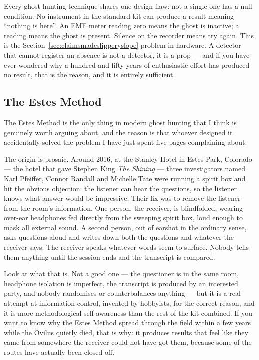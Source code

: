 \ufowrapclear
\begin{funfact}
Every ghost-hunting technique shares one design flaw: not a single one has a null condition. No
instrument in the standard kit can produce a result meaning ``nothing is here''. An EMF meter
reading zero means the ghost is inactive; a reading means the ghost is present. Silence on the
recorder means try again. This is the Section~\ref{sec:claimsmadeslipperyslope} problem in hardware. A detector that cannot
register an absence is not a detector, it is a prop --- and if you have ever wondered why a
hundred and fifty years of enthusiastic effort has produced no result, that is the reason, and
it is entirely sufficient.
\end{funfact}

\ufowrapclear
\subsection{The Estes Method}\label{sec:estes}
The Estes Method is the only thing in modern ghost hunting that I think is genuinely worth
arguing about, and the reason is that whoever designed it accidentally solved the problem I have
just spent five pages complaining about.

The origin is prosaic. Around 2016, at the Stanley Hotel in Estes Park, Colorado --- the hotel
that gave Stephen King \emph{The Shining} --- three investigators named Karl Pfeiffer, Connor
Randall and Michelle Tate were running a spirit box and hit the obvious objection: the listener
can hear the questions, so the listener knows what answer would be impressive. Their fix was to
remove the listener from the room's information. One person, the receiver, is blindfolded, wearing
over-ear headphones fed directly from the sweeping spirit box, loud enough to mask all external
sound. A second person, out of earshot in the ordinary sense, asks questions aloud and writes
down both the questions and whatever the receiver says. The receiver speaks whatever words seem
to surface. Nobody tells them anything until the session ends and the transcript is compared.

Look at what that is.  Not a good one --- the questioner is in
the same room, headphone isolation is imperfect, the transcript is produced by an interested
party, and nobody randomises or counterbalances anything --- but it is a real attempt at
information control, invented by hobbyists, for the correct reason, and it is more methodological
self-awareness than the rest of the kit combined. If you want to know why the Estes Method spread
through the field within a few years while the Ovilus quietly died, that is why: it produces
results that feel like they came from somewhere the receiver could not have got them, because
some of the routes have actually been closed off.

